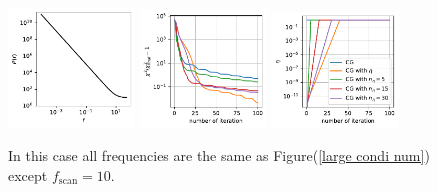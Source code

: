 \documentclass[twocolumn,linenumbers]{aastex631}
\begin{document}
\begin{figure}[htb!]
\includegraphics[width=0.3\textwidth]{10/large_condition_num/p_f.pdf}
\includegraphics[width=0.3\textwidth]{10/large_condition_num/chi2.pdf}
\includegraphics[width=0.3\textwidth]{10/large_condition_num/eta.pdf}
\caption{In this case all frequencies are the same as
    Figure(\ref{large condi num}) except $f_{\text{scan}} = 10$.
}
\label{large condi num 10}
\end{figure}










{}



\end{document}
